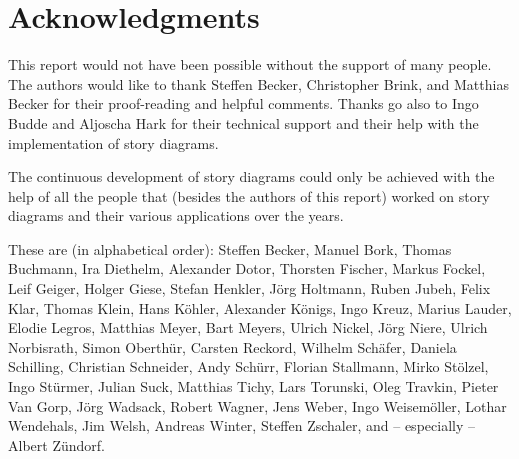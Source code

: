 \section*{Acknowledgments}

This report would not have been possible without the support of many people. The authors would like to thank Steffen Becker, Christopher Brink, and Matthias Becker for their proof-reading and helpful comments. Thanks go also to Ingo Budde and Aljoscha Hark for their technical support and their help with the implementation of story diagrams.

The continuous development of story diagrams could only be achieved with the help 
of all the people that (besides the authors of this report) worked on story diagrams and their various applications over the years.

These are (in alphabetical order): 
Steffen Becker, Manuel Bork, Thomas Buchmann, 
Ira Diethelm, Alexander Dotor, 
Thorsten Fischer, Markus Fockel,
Leif Geiger, Holger Giese, 
Stefan Henkler, J\"{o}rg Holtmann,
Ruben Jubeh,
Felix Klar, Thomas Klein, Hans K\"{o}hler, Alexander K\"{o}nigs, Ingo Kreuz, 
Marius Lauder, Elodie Legros,
Matthias Meyer, Bart Meyers, 
Ulrich Nickel, J\"{o}rg Niere, Ulrich Norbisrath,
Simon Oberth\"{u}r, 
Carsten Reckord, 
Wilhelm Sch\"{a}fer, Daniela Schilling, Christian Schneider, Andy Sch\"{u}rr, Florian Stallmann, Mirko St\"{o}lzel, Ingo St\"{u}rmer, Julian Suck,
Matthias Tichy, Lars Torunski, Oleg Travkin, 
Pieter Van Gorp, 
J\"{o}rg Wadsack, Robert Wagner, Jens Weber, Ingo Weisem\"{o}ller, Lothar Wendehals, Jim Welsh, Andreas Winter, 
Steffen Zschaler, and -- especially -- Albert Z\"{u}ndorf.